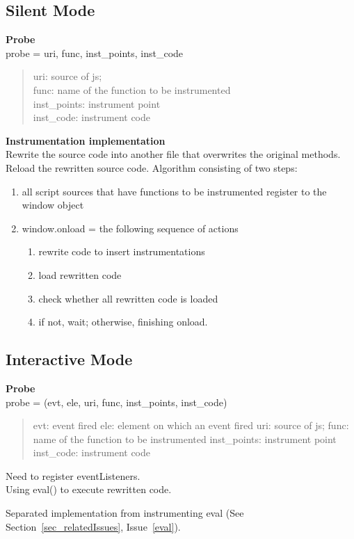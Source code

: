\documentclass[a4paper,twocolumn,10pt]{article}
\begin{document}
\subsection{Silent Mode}
\textbf{Probe}\\ probe = {uri, func, inst\_points, inst\_code}
\begin{quote}
uri: source of js;\\
func: name of the function to be instrumented\\
inst\_points: instrument point\\
inst\_code: instrument code\\
\end{quote}
\textbf{Instrumentation implementation}\\
Rewrite the source code into another file that overwrites the original methods. Reload the rewritten source code.
Algorithm consisting of two steps:
\begin{enumerate}
  \item all script sources that have functions to be instrumented register to the window object
  \item window.onload = the following sequence of actions
  \begin{enumerate}
    \item rewrite code to insert instrumentations
    \item load rewritten code
    \item check whether all rewritten code is loaded
    \item if not, wait; otherwise, finishing onload.
  \end{enumerate}
\end{enumerate}

\subsection{Interactive Mode}
\textbf{Probe}\\ probe = (evt, ele, uri, func, inst\_points, inst\_code)
\begin{quote}
evt: event fired
ele: element on which an event fired
uri: source of js;
func: name of the function to be instrumented
inst\_points: instrument point
inst\_code: instrument code
\end{quote}

Need to register eventListeners.\\

Using eval() to execute rewritten code.

Separated implementation from instrumenting eval (See Section~\ref{sec_relatedIssues}, Issue~\ref{eval}).
\end{document}
